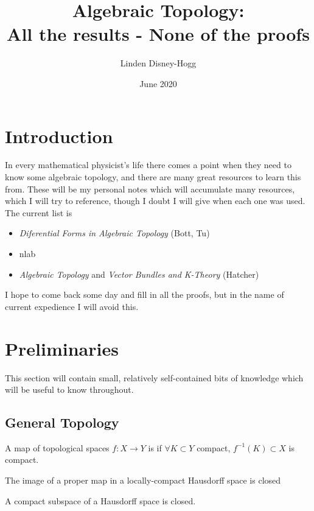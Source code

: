 \documentclass{article}
\title{Algebraic Topology: \\ All the results - None of the proofs }
\author{Linden Disney-Hogg}
\date{June 2020}
\begin{document}
\maketitle
\tableofcontents

\section{Introduction}
In every mathematical physicist's life there comes a point when they need to know some algebraic topology, and there are many great resources to learn this from. These will be my personal notes which will accumulate many resources, which I will try to reference, though I doubt I will give when each one was used. The current list is 
\begin{itemize}
	\item \textit{Diferential Forms in Algebraic Topology} (Bott, Tu)
	\item nlab
	\item \textit{Algebraic Topology} and \textit{Vector Bundles and K-Theory} (Hatcher) 
\end{itemize} 
I hope to come back some day and fill in all the proofs, but in the name of current expedience I will avoid this. 
\section{Preliminaries}
This section will contain small, relatively self-contained bits of knowledge which will be useful to know throughout. 
\subsection{General Topology}

\begin{definition}
	A map of topological spaces $f:X \to Y$ is  if $\forall K \subset Y$ compact, $f^{-1}(K)\subset X$ is compact. 
\end{definition}

\begin{prop}
	The image of a proper map in a locally-compact Hausdorff space is closed
\end{prop}

\begin{prop}
	A compact subspace of a Hausdorff space is closed. 
\end{prop}
\end{document}
